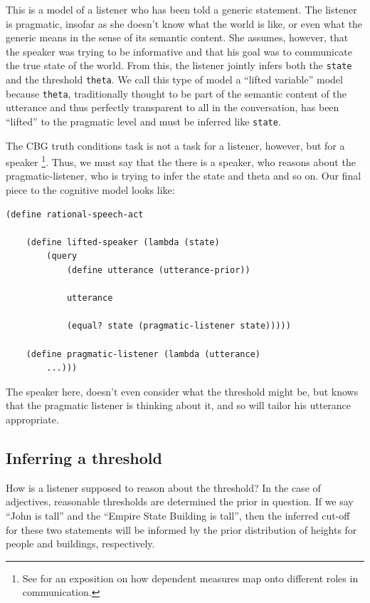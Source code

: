 \documentclass[10pt,letterpaper]{article}
\begin{document}
This is a model of a listener who has been told a generic statement. The listener is pragmatic, insofar as she doesn't know what the world is like, or even what the generic means in the sense of its semantic content. She assumes, however, that the speaker was trying to be informative and that his goal was to communicate the true state of the world. From this, the listener jointly infers both the \lstinline{state} and the threshold \lstinline{theta}. We call this type of model a ``lifted variable'' model because \lstinline{theta}, traditionally thought to be part of the semantic content of the utterance and thus perfectly transparent to all in the conversation, has been ``lifted'' to the pragmatic level and must be inferred like \lstinline{state}.

The CBG truth conditions task is not a task for a listener, however, but for a speaker \footnote{See  for an exposition on how dependent measures map onto different roles in communication.}. Thus, we must say that the there is a speaker, who reasons about the pragmatic-listener, who is trying to infer the state and theta and so on. Our final piece to the cognitive model looks like:

\begin{lstlisting}
(define rational-speech-act

	(define lifted-speaker (lambda (state)
		(query
			(define utterance (utterance-prior))
			
			utterance
			
			(equal? state (pragmatic-listener state)))))	
			
	(define pragmatic-listener (lambda (utterance)
		...)))
\end{lstlisting}

The speaker here, doesn't even consider what the threshold might be, but knows that the pragmatic listener is thinking about it, and so will tailor his utterance appropriate.

\subsection{Inferring a threshold}

How is a listener supposed to reason about the threshold? In the case of adjectives, reasonable thresholds are determined the prior in question. If we say ``John is tall'' and the ``Empire State Building is tall'', then the inferred cut-off for these two statements will be informed by the prior distribution of heights for people and buildings, respectively. 
\end{document}
